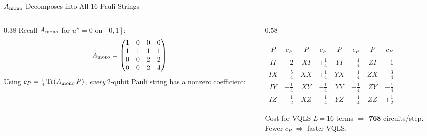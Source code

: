 \documentclass{beamer}
\begin{document}
\begin{frame}{$A_{\rm mono}$ Decomposes into All 16 Pauli Strings}

  \begin{columns}[T]
    \begin{column}{0.38\textwidth}
      Recall $A_{\rm mono}$ for $u''=0$ on $[0,1]$:
      \[
        A_{\rm mono} = \begin{pmatrix}
          1&0&0&0\\1&1&1&1\\0&0&2&2\\0&0&2&4
        \end{pmatrix}
      \]
      Using $c_P = \tfrac{1}{4}\operatorname{Tr}(A_{\rm mono}\,P)$,
      \emph{every} 2-qubit Pauli string has a nonzero coefficient:
    \end{column}
    \begin{column}{0.58\textwidth}
      \renewcommand{\arraystretch}{1.05}
      \begin{center}
      \footnotesize
      \begin{tabular}{cc|cc|cc|cc}
        \toprule
        $P$ & $c_P$ & $P$ & $c_P$ & $P$ & $c_P$ & $P$ & $c_P$ \\
        \midrule
        $II$ & $+2$       & $XI$ & $+\tfrac{1}{4}$  & $YI$ & $+\tfrac{1}{4}$  & $ZI$ & $-1$       \\
        $IX$ & $+\tfrac{5}{4}$  & $XX$ & $+\tfrac{1}{4}$  & $YX$ & $+\tfrac{1}{4}$  & $ZX$ & $-\tfrac{3}{4}$  \\
        $IY$ & $-\tfrac{1}{4}$  & $XY$ & $-\tfrac{1}{4}$  & $YY$ & $+\tfrac{1}{4}$  & $ZY$ & $-\tfrac{1}{4}$  \\
        $IZ$ & $-\tfrac{1}{2}$  & $XZ$ & $-\tfrac{1}{4}$  & $YZ$ & $-\tfrac{1}{4}$  & $ZZ$ & $+\tfrac{1}{2}$  \\
        \bottomrule
      \end{tabular}
      \end{center}

      \vspace{4pt}
      \begin{alertblock}{Cost for VQLS}
        \small $L{=}16$ terms $\Rightarrow$ \textbf{768} circuits/step.\\
        Fewer $c_P$ $\Rightarrow$ faster VQLS.
      \end{alertblock}
    \end{column}
  \end{columns}
\end{frame}
\end{document}
